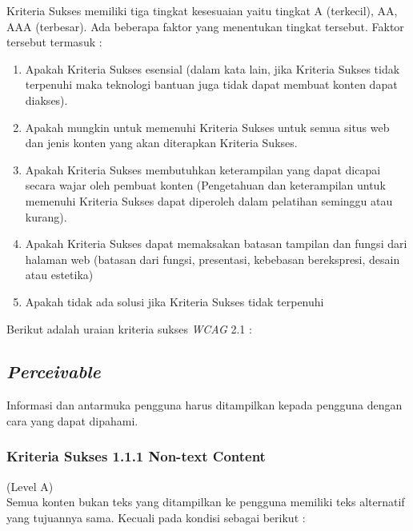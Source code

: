 \documentclass[a4paper,twoside]{article}
\begin{document}
\begin{enumerate}
		Kriteria Sukses memiliki tiga tingkat kesesuaian yaitu tingkat A (terkecil), AA, AAA (terbesar). Ada beberapa faktor yang menentukan tingkat tersebut. Faktor tersebut termasuk :
		
		\begin{enumerate}
			\item Apakah Kriteria Sukses esensial (dalam kata lain, jika Kriteria Sukses tidak terpenuhi maka teknologi bantuan juga tidak dapat membuat konten dapat diakses).
			\item Apakah mungkin untuk memenuhi Kriteria Sukses untuk semua situs web dan jenis konten yang akan diterapkan Kriteria Sukses.
			\item Apakah Kriteria Sukses membutuhkan keterampilan yang dapat dicapai secara wajar oleh pembuat konten (Pengetahuan dan keterampilan untuk memenuhi Kriteria Sukses dapat diperoleh dalam pelatihan seminggu atau kurang).
			\item Apakah Kriteria Sukses dapat memaksakan batasan tampilan dan fungsi dari halaman web (batasan dari fungsi, presentasi, kebebasan berekspresi, desain atau estetika)
			\item Apakah tidak ada solusi jika Kriteria Sukses tidak terpenuhi
		\end{enumerate}
		
		Berikut adalah uraian kriteria sukses \textit{WCAG} 2.1 :		
		\subsection*{\textit{Perceivable}}
		\label{subsec:perceivable}
		Informasi dan antarmuka pengguna harus ditampilkan kepada pengguna dengan cara yang dapat dipahami.
		
		\subsubsection*{Kriteria Sukses 1.1.1 Non-text Content}
		\label{subsubsec:kriteria_1.1.1}
		(Level A)\\
		
		Semua konten bukan teks yang ditampilkan ke pengguna memiliki teks alternatif yang tujuannya sama. Kecuali pada kondisi sebagai berikut :
		

\end{enumerate}
\end{document}
